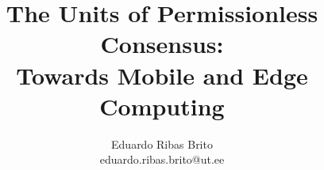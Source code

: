 \documentclass[journal]{IEEEtran}
\begin{document}
%
\title{The Units of Permissionless Consensus: \\ Towards Mobile and Edge Computing}
%
%
%

\author{Eduardo Ribas Brito \\ eduardo.ribas.brito@ut.ee}

% 
%



% 
\end{document}
